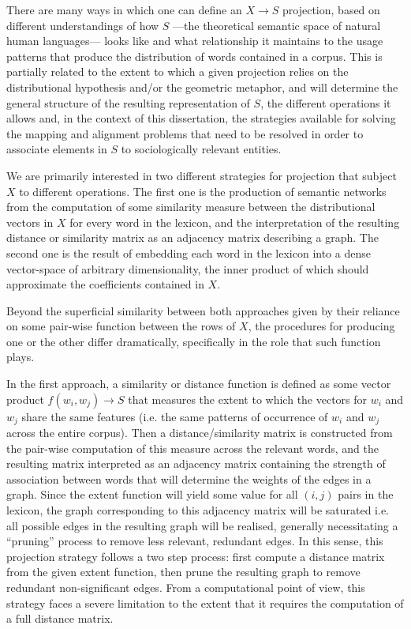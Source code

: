 There are many ways in which one can define an $X \rightarrow S$ projection, based on different understandings of how $S$ ---the theoretical semantic space of natural human languages--- looks like and what relationship it maintains to the usage patterns that produce the distribution of words contained in a corpus.
This is partially related to the extent to which a given projection relies on the distributional hypothesis and/or the geometric metaphor, and will determine the general structure of the resulting representation of $S$, the different operations it allows and, in the context of this dissertation, the strategies available for solving the mapping and alignment problems that need to be resolved in order to associate elements in $S$ to sociologically relevant entities.

We are primarily interested in two different strategies for projection that subject $X$ to different operations.
The first one is the production of semantic networks from the computation of some similarity measure between the distributional vectors in $X$ for every word in the lexicon, and the interpretation of the resulting distance or similarity matrix as an adjacency matrix describing a graph.
The second one is the result of embedding each word in the lexicon into a dense vector-space of arbitrary dimensionality, the inner product of which should approximate the coefficients contained in $X$.

Beyond the superficial similarity between both approaches given by their reliance on some pair-wise function between the rows of $X$, the procedures for producing one or the other differ dramatically, specifically in the role that such function plays.

In the first approach, a similarity or distance function is defined as some vector product $f(w_i,w_j) \rightarrow S$ that measures the extent to which the vectors for $w_i$ and $w_j$ share the same features (i.e. the same patterns of occurrence of $w_i$ and $w_j$ across the entire corpus).
Then a distance/similarity matrix is constructed from the pair-wise computation of this measure across the relevant words, and the resulting matrix interpreted as an adjacency matrix containing the strength of association between words that will determine the weights of the edges in a graph.
Since the extent function will yield some value for all $(i,j)$ pairs in the lexicon, the graph corresponding to this adjacency matrix will be saturated i.e. all possible edges in the resulting graph will be realised, generally necessitating a ``pruning'' process to remove less relevant, redundant edges.
In this sense, this projection strategy follows a two step process: first compute a distance matrix from the given extent function, then prune the resulting graph to remove redundant non-significant edges.
From a computational point of view, this strategy faces a severe limitation to the extent that it requires the computation of a full distance matrix.

